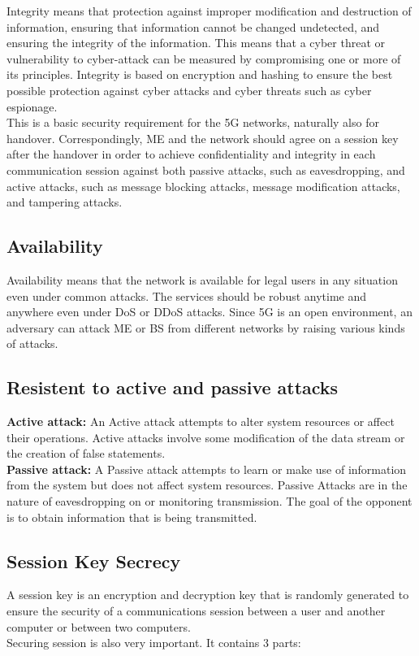 {{        Integrity means that protection against improper modification and 
        destruction of information, ensuring that information cannot be 
        changed undetected, and ensuring the integrity of the information. 
        This means that a cyber threat or vulnerability to cyber-attack can 
        be measured by compromising one or more of its principles. Integrity 
        is based on encryption and hashing to ensure the best possible 
        protection against cyber attacks and cyber threats such as cyber espionage.\\

        This is a basic security requirement for the 5G networks, naturally
        also for handover. Correspondingly, ME and the network
        should agree on a session key after the handover in order to
        achieve confidentiality and integrity in each communication
        session against both passive attacks, such as eavesdropping,
        and active attacks, such as message blocking attacks, message
        modification attacks, and tampering attacks.
    }
    \subsection{Availability}{
        Availability means that the network is
        available for legal users in any situation even under common
        attacks. The services should be robust anytime and anywhere
        even under DoS or DDoS attacks. Since 5G is an open
        environment, an adversary can attack ME or BS from different
        networks by raising various kinds of attacks.
    }
    \subsection{Resistent to active and passive attacks}{
        \textbf{Active attack: } An Active attack attempts to alter system resources or affect their operations. Active attacks involve some modification of the data stream or the creation of false statements. \\[0.6\baselineskip]
        \textbf{Passive attack: } A Passive attack attempts to learn or make use of information from the system but does not affect system resources. Passive Attacks are in the nature of eavesdropping on or monitoring transmission. The goal of the opponent is to obtain information that is being transmitted.

    }
    \subsection{Session Key Secrecy}{
        A session key is an encryption and decryption key that is randomly 
        generated to ensure the security of a communications session between 
        a user and another computer or between two computers.\\
        Securing session is also very important. It contains 3 parts:
}}
